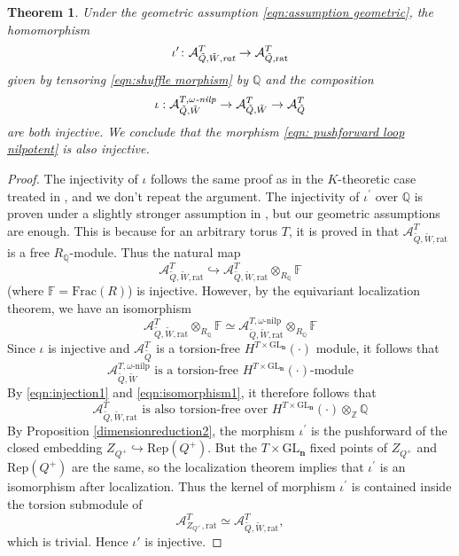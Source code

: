 \documentclass{amsart}
\newtheorem{theorem}{Theorem}[section]
\def\GL{\mathrm{GL}}
\def\BF{{\mathbb{F}}}
\def\BQ{{\mathbb{Q}}}
\def\bn{{\boldsymbol{n}}}
\def\tQ{\tilde{Q}}
\def\tW{\tilde{W}}
\def\ring{R}
\def\field{\BF}
\def\khrat{\mathcal{A}^{T}_{\tQ,\tW,\text{rat}}}
\def\khrate{\mathcal{A}^{T}_{\tQ,\tW,\emph{rat}}}
\def\kha{\mathcal{A}^{T,\omega\text{-nilp}}_{\tQ,\tW}}
\def\kharat{\mathcal{A}^{T,\omega\text{-nilp}}_{\tQ,\tW,\text{rat}}}
\begin{document}
\medskip

\begin{theorem} \label{thm: injection}
Under the geometric assumption \eqref{eqn:assumption geometric}, the homomorphism 
\[ 
\iota^{\prime} \colon \khrate \rightarrow \mathcal{A}^T_{\tilde{Q},\mathrm{rat}} 
\] 
given by tensoring \eqref{eqn:shuffle morphism} by $\mathbb{Q}$ and the composition
\[ 
\iota: \mathcal{A}^{T,\omega\emph{-nilp}}_{\tilde{Q},\tilde{W}} \rightarrow \mathcal{A}^{T}_{\tilde{Q},\tilde{W}}  \rightarrow \mathcal{A}^T_{\tilde{Q}}
\]
are both injective. We conclude that the morphism \eqref{eqn: pushforward loop nilpotent} is also injective.

\end{theorem}

\medskip 

\begin{proof} The injectivity of $\iota$ follows the same proof as in the $K$-theoretic case treated in \cite[Theorem 2.1]{JNCoulomb}, and we don't repeat the argument. The injectivity of $\iota^\prime$ over $\BQ$ is proven under a slightly stronger assumption in \cite{davison2022integrality}, but our geometric assumptions are enough. This is because for an arbitrary torus $T$, it is proved in \cite[Corollary 9.7]{davison2022integrality} that $\khrat$ is a free $R_{\mathbb{Q}}$-module. Thus the natural map
\begin{equation} 
\label{eqn:injection1}
\khrat \hookrightarrow  \khrat \otimes_{\ring_{\mathbb{Q}}} \field
\end{equation}
(where $\field = \text{Frac}(\ring)$) is injective. However, by the equivariant localization theorem, we have an isomorphism
\begin{equation} 
\label{eqn:isomorphism1}
\khrat \otimes_{\ring_{\mathbb{Q}}} \mathbb{\field} \simeq \kharat \otimes_{\ring_{\mathbb{Q}}} \field
\end{equation}
Since $\iota$ is injective and $\mathcal{A}^T_{\tilde{Q}}$ is a torsion-free $H^{T \times \GL_\bn}(\cdot)$ module, it follows that 
\begin{equation} 
\label{eqn:tf 1}
\kha \text{ is a torsion-free }H^{T \times \GL_\bn}(\cdot)\text{-module}
\end{equation}
By \eqref{eqn:injection1} and \eqref{eqn:isomorphism1}, it therefore follows that 
\begin{equation} 
\label{eqn:tf 2}
\khrat \text{ is also torsion-free over }H^{T \times \mathrm{GL}_{\bn}}(\cdot) \otimes_{\mathbb{Z}} \mathbb{Q}
\end{equation}
By Proposition \ref{dimensionreduction2}, the morphism $\iota^{\prime}$ is the pushforward of the closed embedding $Z_{Q^+} \hookrightarrow \mathrm{Rep}(Q^+)$. But the $T \times \mathrm{GL}_{\bn}$ fixed points of $Z_{Q^+}$ and $\mathrm{Rep}(Q^+)$ are the same, so the localization theorem implies that $\iota^{\prime}$ is an isomorphism after localization. Thus the kernel of morphism $\iota^{\prime}$ is contained inside the torsion submodule of 
$$
\mathcal{A}^T_{Z_{Q^+},\text{rat}} \simeq \khrat,
$$
which is trivial. Hence $\iota'$ is injective. \end{proof}
\end{document}
